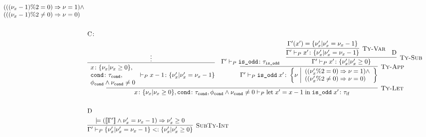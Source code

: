 \begin{align*}
{{\begin{array}{l}
        \paren{\paren{\paren{\nu_x - 1} \% 2 = 0} \Rightarrow \nu = 1} \land \\
        \paren{\paren{\paren{\nu_x - 1} \% 2 \neq 0} \Rightarrow \nu = 0}
      \end{array}
    }
  } \\\\
  & \mathrm{C} \colon \\
  & \infer[\TyRuleLet] {
    \TyJudge{P}
      {
        \typed{x}{\TyInt{\nu_x}{\nu_x \geq 0}},
        \typed{\code{cond}}{\tau_\code{cond}},
        \phi_\code{cond} \land \nu_\code{cond} \neq 0
      }
      {
        \Let{\; x'}{x-1 \;}{ \;
        \App{\code{is\_odd}}{x'}}
      }
      {\tau_\mathrm{if}}
  } {
    \infer {
      \TyJudge{P}{\begin{array}{l}
        \typed{x}{\TyInt{\nu_x}{\nu_x \geq 0}}, \\
        \typed{\code{cond}}{\tau_\code{cond}}, \\
        \phi_\code{cond} \land \nu_\code{cond} \neq 0
      \end{array}}
      {x - 1}
      {\TyInt{\nu_x'}{\nu_x' = \nu_x - 1}}
    } { \vdots }
    \quad
    \infer[\TyRuleApp] {
      \TyJudge{P}
        {\Gamma'}
        {\App{\code{is\_odd}}{x'}}
        {\left\TyInt{\nu \; \middle}{\begin{array}{l}
          \paren{\paren{\nu_x' \% 2 = 0} \Rightarrow \nu = 1} \land \\
          \paren{\paren{\nu_x' \% 2 \neq 0} \Rightarrow \nu = 0}
        \end{array}\right}}
    } {
      \TyJudge{P}{\Gamma'}{\code{is\_odd}}{\tau_\code{is\_odd}}
      \quad
      \infer[\TyRuleSub] {
        \TyJudge{P}{\Gamma'}{x'}{\TyInt{\nu_x'}{\nu_x' \geq 0}}
      } {
        \infer[\TyRuleVar] {
          \TyJudge{P}{\Gamma'}{x'}{\TyInt{\nu_x'}{\nu_x' = \nu_x - 1}}
        } { \Gamma'\paren{x'} = \TyInt{\nu_x'}{\nu_x' = \nu_x - 1}}
        & \mathrm{D}
      }
    }
  } \\\\
  & \mathrm{D} \\
  & \infer[\SubTyRuleInt] {
    \SubTyJudge{P}{\Gamma'}{\TyInt{\nu_x'}{\nu_x' = \nu_x - 1}}{\TyInt{\nu_x'}{\nu_x' \geq 0}}
  } {
    \models \paren{\sem{\Gamma'} \land \nu_x' = \nu_x - 1} \Rightarrow \nu_x' \geq 0
  }
\end{align*}

